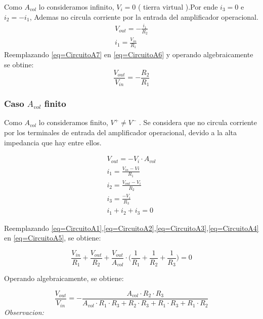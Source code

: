 \documentclass[../../main.tex]{subfiles}
\begin{document}
Como $A_{vol}$ lo consideramos infinito, $V_{i}=0$ \big( tierra virtual \big).Por ende $i_{3}=0$ e $i_{2}=-i_{1}$, Ademas no circula corriente por la entrada del   amplificador operacional.
\begin{gather}
V_{out}=-\frac{i_{1}}{R_{2}}\label{eq=CircuitoA6}\\
i_{1}=\frac{V_{in}}{R_{1}}\label{eq=CircuitoA7}
\end{gather}
Reemplazando \ref{eq=CircuitoA7} en \ref{eq=CircuitoA6} y operando algebraicamente se obtine:
\begin{equation}
\frac{V_{out}}{V_{in}}= -\frac{R_{2}}{R_{1}} \label{eq=CircuitoAideal}
\end{equation}


\subsubsection{Caso $A_{vol}$ finito}

Como $A_{vol}$  lo consideramos finito, $V^{+}\neq V^{-}$ . Se considera que no circula corriente por  los terminales de entrada del amplificador operacional, devido a la alta impedancia que hay entre ellos.

\begin{gather}
V_{out}= -V_{i}\cdot A_{vol}\label{eq=CircuitoA1}\\
i_{1}=\frac{V_{in}-V{i}}{R_{1}}\label{eq=CircuitoA2}\\
i_{2}=\frac{V_{out}-V_{i}}{R_{2}}\label{eq=CircuitoA3}\\
i_{3}=\frac{-V_{i}}{R_{3}}\label{eq=CircuitoA4}\\
i_{1}+i_{2}+i_{3}=0\label{eq=CircuitoA5}
\end{gather}

Reemplazando \ref{eq=CircuitoA1},\ref{eq=CircuitoA2},\ref{eq=CircuitoA3},\ref{eq=CircuitoA4} en \ref{eq=CircuitoA5}, se obtiene:


$$\frac{V_{in}}{R_{1}} + \frac{V_{out}}{R_{2}}+\frac{V_{out}}{A_{vol}}\cdot \bigg( \frac{1}{R_{1}} + \frac{1}{R_{2}} + \frac{1}{R_{3}} \bigg) = 0$$

Operando algebraicamente, se obtiene:

\begin{equation}
\frac{V_{out}}{V_{in}}= - \frac{A_{vol} \cdot R_{2} \cdot R_{3}}{A_{vol}\cdot R_{1} \cdot R_{3} + R_{2} \cdot R_{3} +  R_{1} \cdot R_{3} + R_{1} \cdot R_{2} }\label{eq=gananciaAfinito}
\end{equation}
\textit{Observacion:}
\end{document}
